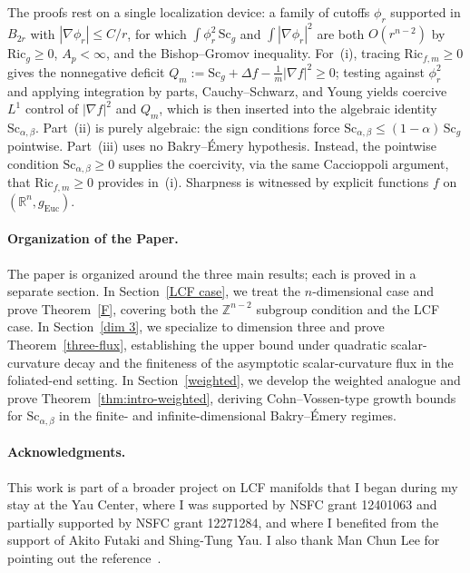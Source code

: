 \documentclass[12pt,oneside,a4paper]{article}
\theoremstyle{mytheorem}
\theoremstyle{remark}
\begin{document}
The proofs rest on a single localization device: a family of cutoffs
$\phi_r$ supported in $B_{2r}$ with $|\nabla\phi_r|\le C/r$, for which
$\int\phi_r^2\,\mathrm{Sc}_g$ and $\int|\nabla\phi_r|^2$ are both
$O(r^{n-2})$ by $\mathrm{Ric}_g\ge 0$, $A_p<\infty$, and the Bishop--Gromov inequality.
For~(i), tracing $\mathrm{Ric}_{f,m}\ge 0$ gives the nonnegative deficit
$Q_m:=\mathrm{Sc}_g+\Delta f-\tfrac{1}{m}|\nabla f|^2\ge 0$; testing against
$\phi_r^2$ and applying integration by parts, Cauchy--Schwarz, and Young
yields coercive $L^1$ control of $|\nabla f|^2$ and $Q_m$, which is then inserted into the algebraic identity $\mathrm{Sc}_{\alpha,\beta}$. Part~(ii) is purely
algebraic: the sign conditions force
$\mathrm{Sc}_{\alpha,\beta}\le(1-\alpha)\,\mathrm{Sc}_g$ pointwise. Part~(iii)
uses no Bakry--\'Emery hypothesis.  Instead, the pointwise condition
$\mathrm{Sc}_{\alpha,\beta}\ge 0$ supplies the coercivity, via the same
Caccioppoli argument, that $\mathrm{Ric}_{f,m}\ge 0$ provides in~(i).
Sharpness is witnessed by explicit functions $f$ on
$(\mathbb{R}^n,g_{\mathrm{Euc}})$.





\paragraph*{Organization of the Paper.}
The paper is organized around the three main results; each is proved in a separate section. In Section~\ref{LCF case}, we treat the \(n\)-dimensional case and
prove Theorem~\ref{F}, covering both the \(\mathbb Z^{n-2}\) subgroup
condition and the LCF case. In Section~\ref{dim 3}, we
specialize to dimension three and prove Theorem~\ref{three-flux},
establishing the upper bound under quadratic
scalar-curvature decay and the finiteness of the asymptotic scalar-curvature
flux in the foliated-end setting. In Section~\ref{weighted}, we develop the
weighted analogue and prove Theorem~\ref{thm:intro-weighted}, deriving
Cohn--Vossen-type growth bounds for \(\mathrm{Sc}_{\alpha,\beta}\) in the
finite- and infinite-dimensional Bakry--\'Emery regimes.




\paragraph*{Acknowledgments.}
This work is part of a broader project on LCF manifolds
that I began during my stay at the Yau  Center, where I
was supported by NSFC grant 12401063 and partially supported by NSFC grant 12271284, and
where I benefited from the support of Akito Futaki and Shing-Tung Yau. I also thank Man Chun Lee for pointing out the reference~\cite{zbMATH06423474}.
\end{document}
